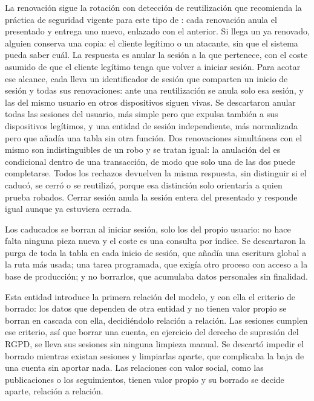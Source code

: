 La renovación sigue la rotación con detección de reutilización que recomienda la práctica de seguridad vigente para este tipo de  \parencite[apartado~4.14]{rfc-9700}: cada renovación anula el  presentado y entrega uno nuevo, enlazado con el anterior.
Si llega un  ya renovado, alguien conserva una copia: el cliente legítimo o un atacante, sin que el sistema pueda saber cuál.
La respuesta es anular la sesión a la que pertenece, con el coste asumido de que el cliente legítimo tenga que volver a iniciar sesión.
Para acotar ese alcance, cada  lleva un identificador de sesión que comparten un inicio de sesión y todas sus renovaciones: ante una reutilización se anula solo esa sesión, y las del mismo usuario en otros dispositivos siguen vivas.
Se descartaron anular todas las sesiones del usuario, más simple pero que expulsa también a sus dispositivos legítimos, y una entidad de sesión independiente, más normalizada pero que añadía una tabla sin otra función.
Dos renovaciones simultáneas con el mismo  son indistinguibles de un robo y se tratan igual: la anulación del  es condicional dentro de una transacción, de modo que solo una de las dos puede completarse.
Todos los rechazos devuelven la misma respuesta, sin distinguir si el  caducó, se cerró o se reutilizó, porque esa distinción solo orientaría a quien prueba  robados.
Cerrar sesión anula la sesión entera del  presentado y responde igual aunque ya estuviera cerrada.

Los  caducados se borran al iniciar sesión, solo los del propio usuario: no hace falta ninguna pieza nueva y el coste es una consulta por índice.
Se descartaron la purga de toda la tabla en cada inicio de sesión, que añadía una escritura global a la ruta más usada; una tarea programada, que exigía otro proceso con acceso a la base de producción; y no borrarlos, que acumulaba datos personales sin finalidad.

Esta entidad introduce la primera relación del modelo, y con ella el criterio de borrado: los datos que dependen de otra entidad y no tienen valor propio se borran en cascada con ella, decidiéndolo relación a relación.
Las sesiones cumplen ese criterio, así que borrar una cuenta, en ejercicio del derecho de supresión del \ac{RGPD}, se lleva sus sesiones sin ninguna limpieza manual.
Se descartó impedir el borrado mientras existan sesiones y limpiarlas aparte, que complicaba la baja de una cuenta sin aportar nada.
Las relaciones con valor social, como las publicaciones o los seguimientos, tienen valor propio y su borrado se decide aparte, relación a relación.

